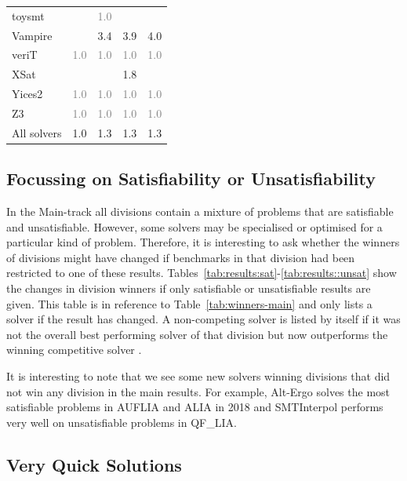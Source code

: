 \documentclass[dvipsnames,table,twoside,11pt]{article}
\begin{document}
\begin{table}
\begin{tabular}{lrrrr}
    toysmt            &     & \textcolor{gray}{1.0} &     &     \\
    Vampire           &     & 3.4 & 3.9 & 4.0 \\
    veriT             & \textcolor{gray}{1.0} & \textcolor{gray}{1.0} & \textcolor{gray}{1.0} & \textcolor{gray}{1.0} \\
    XSat              &     &     & 1.8 &     \\
    Yices2            & \textcolor{gray}{1.0} & \textcolor{gray}{1.0} & \textcolor{gray}{1.0} & \textcolor{gray}{1.0} \\
    Z3                & \textcolor{gray}{1.0} & \textcolor{gray}{1.0} & \textcolor{gray}{1.0} & \textcolor{gray}{1.0} \\
    \midrule
    All solvers       & 1.0 & 1.3 & 1.3 & 1.3 \\
    \bottomrule
  \end{tabular}
\end{table}

\subsection{Focussing on Satisfiability or Unsatisfiability} 

In the Main-track all divisions contain a mixture of problems that are satisfiable and unsatisfiable. However, some solvers may be specialised or optimised for a particular kind of problem. Therefore, it is interesting to ask whether the winners of divisions might have changed if benchmarks in that division had been restricted to one of these results. Tables~\ref{tab:results:sat}-\ref{tab:results::unsat} show the changes in division winners if only satisfiable or unsatisfiable results are given. This table is in reference to Table~\ref{tab:winners-main} and only lists a solver if the result has changed. A non-competing solver is listed by itself if it was not the overall best performing solver of that division but now outperforms the winning competitive solver .

It is interesting to note that we see some new solvers winning divisions that did not win any division in the main results. For example, Alt-Ergo solves the most satisfiable problems in AUFLIA and ALIA in 2018 and SMTInterpol performs very well on unsatisfiable problems in QF\_LIA.



\subsection{Very Quick Solutions}
\end{document}
